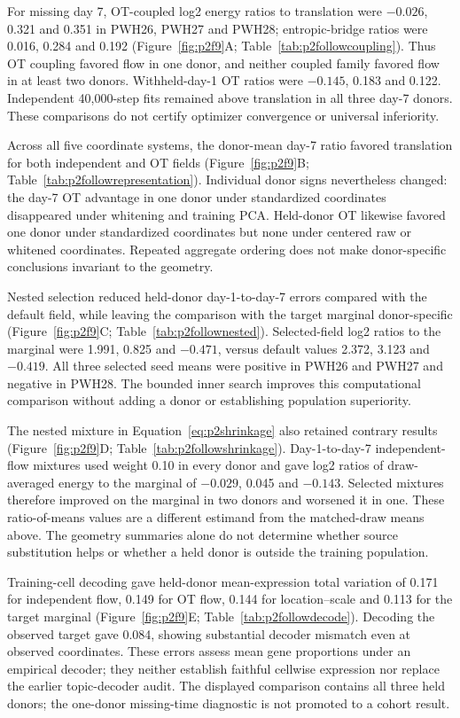 For missing day 7, OT-coupled log2 energy ratios to translation were $-0.026$, 0.321 and 0.351 in PWH26, PWH27 and PWH28; entropic-bridge ratios were 0.016, 0.284 and 0.192 (Figure~\ref{fig:p2f9}A\label{call:p2f9}; Table~\ref{tab:p2followcoupling}). Thus OT coupling favored flow in one donor, and neither coupled family favored flow in at least two donors. Withheld-day-1 OT ratios were $-0.145$, 0.183 and 0.122. Independent 40,000-step fits remained above translation in all three day-7 donors. These comparisons do not certify optimizer convergence or universal inferiority.

Across all five coordinate systems, the donor-mean day-7 ratio favored translation for both independent and OT fields (Figure~\ref{fig:p2f9}B; Table~\ref{tab:p2followrepresentation}). Individual donor signs nevertheless changed: the day-7 OT advantage in one donor under standardized coordinates disappeared under whitening and training PCA. Held-donor OT likewise favored one donor under standardized coordinates but none under centered raw or whitened coordinates. Repeated aggregate ordering does not make donor-specific conclusions invariant to the geometry.



Nested selection reduced held-donor day-1-to-day-7 errors compared with the default field, while leaving the comparison with the target marginal donor-specific (Figure~\ref{fig:p2f9}C; Table~\ref{tab:p2follownested}). Selected-field log2 ratios to the marginal were 1.991, 0.825 and $-0.471$, versus default values 2.372, 3.123 and $-0.419$. All three selected seed means were positive in PWH26 and PWH27 and negative in PWH28. The bounded inner search improves this computational comparison without adding a donor or establishing population superiority.

The nested mixture in Equation~\eqref{eq:p2shrinkage} also retained contrary results (Figure~\ref{fig:p2f9}D; Table~\ref{tab:p2followshrinkage}). Day-1-to-day-7 independent-flow mixtures used weight 0.10 in every donor and gave log2 ratios of draw-averaged energy to the marginal of $-0.029$, 0.045 and $-0.143$. Selected mixtures therefore improved on the marginal in two donors and worsened it in one. These ratio-of-means values are a different estimand from the matched-draw means above. The geometry summaries alone do not determine whether source substitution helps or whether a held donor is outside the training population.

Training-cell decoding gave held-donor mean-expression total variation of 0.171 for independent flow, 0.149 for OT flow, 0.144 for location--scale and 0.113 for the target marginal (Figure~\ref{fig:p2f9}E; Table~\ref{tab:p2followdecode}). Decoding the observed target gave 0.084, showing substantial decoder mismatch even at observed coordinates. These errors assess mean gene proportions under an empirical decoder; they neither establish faithful cellwise expression nor replace the earlier topic-decoder audit. The displayed comparison contains all three held donors; the one-donor missing-time diagnostic is not promoted to a cohort result.

